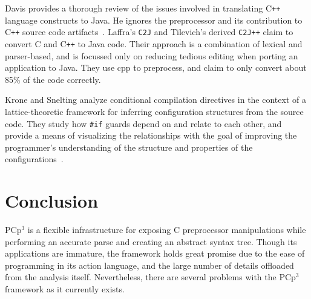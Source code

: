 \documentclass{article}
\newcommand{\pcp}{\mbox{\textsf{PCp}$^3$}}
\newcommand{\Cpp}{\mbox{\textsf{cpp}}}
\newcommand{\CPP}{\mbox{C\texttt{++}}}
\newcommand{\C}{\mbox{C}}
\newcommand{\ppd}[1]{\texttt{\##1}}
\begin{document}
Davis provides a thorough review of the issues involved in translating
\CPP{} language constructs to Java.  He ignores the preprocessor and its
contribution to \CPP{} source code artifacts~\cite{Davis97}.  Laffra's
\texttt{C2J} and Tilevich's derived \texttt{C2J++} claim to convert \C{} and
\CPP{} to Java code.  Their approach is a combination of lexical and
parser-based, and is focussed only on reducing tedious editing when
porting an application to Java.  They use \Cpp{} to preprocess, and
claim to only convert about 85\% of the code correctly.

Krone and Snelting analyze conditional compilation directives in the
context of a lattice-theoretic framework for inferring configuration
structures from the source code.  They study how \ppd{if}
guards depend on and relate to each other, and provide a means of
visualizing the relationships with the goal of improving the
programmer's understanding of the structure and properties of the
configurations~\cite{Krone94}.

\section{Conclusion}
\label{sec:conclusion}





\pcp{} is a flexible infrastructure for
exposing \C{} preprocessor manipulations while performing an
accurate parse and creating an abstract syntax tree.  Though its
applications are immature, the framework holds great promise due
to the ease of programming in its action language, and the large number
of details offloaded from the analysis itself.  Nevertheless, there are several
problems with the \pcp{} framework as it currently exists.
\end{document}
